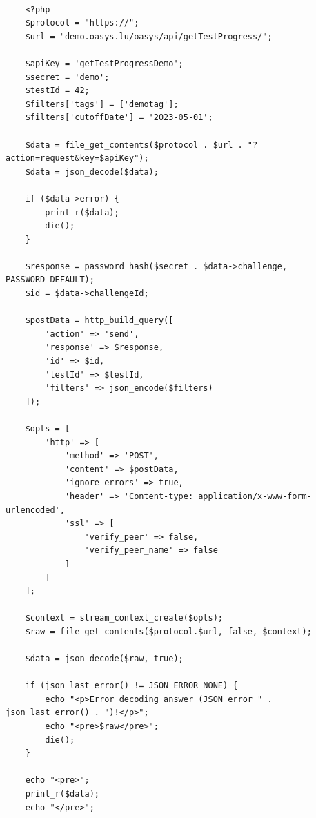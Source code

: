 \documentclass[12pt]{article} %
\begin{document}
    \begin{lstlisting}[style=phpStyle, label={lst:example_01}]

	<?php
	$protocol = "https://";
	$url = "demo.oasys.lu/oasys/api/getTestProgress/";

	$apiKey = 'getTestProgressDemo';
	$secret = 'demo';
	$testId = 42;
	$filters['tags'] = ['demotag'];
	$filters['cutoffDate'] = '2023-05-01';

	$data = file_get_contents($protocol . $url . "?action=request&key=$apiKey");
	$data = json_decode($data);

	if ($data->error) {
		print_r($data);
		die();
	}

	$response = password_hash($secret . $data->challenge, PASSWORD_DEFAULT);
	$id = $data->challengeId;

	$postData = http_build_query([
		'action' => 'send',
		'response' => $response,
		'id' => $id,
		'testId' => $testId,
		'filters' => json_encode($filters)
	]);

	$opts = [
		'http' => [
			'method' => 'POST',
			'content' => $postData,
			'ignore_errors' => true,
			'header' => 'Content-type: application/x-www-form-urlencoded',
			'ssl' => [
				'verify_peer' => false,
				'verify_peer_name' => false
			]
		]
	];

	$context = stream_context_create($opts);
	$raw = file_get_contents($protocol.$url, false, $context);

	$data = json_decode($raw, true);

	if (json_last_error() != JSON_ERROR_NONE) {
		echo "<p>Error decoding answer (JSON error " . json_last_error() . ")!</p>";
		echo "<pre>$raw</pre>";
		die();
	}

	echo "<pre>";
	print_r($data);
	echo "</pre>";

    \end{lstlisting}
\end{document}
